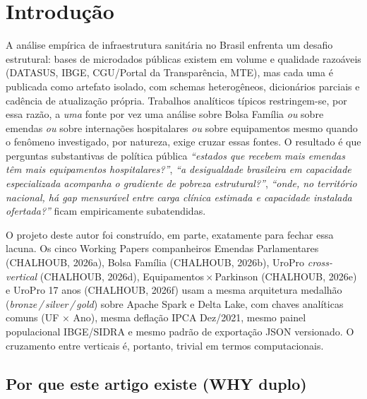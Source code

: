 \documentclass[12pt,a4paper,oneside]{article}
\begin{document}
\newpage
\renewcommand{\contentsname}{Sumário}
\tableofcontents
\vspace{0.5cm}
\renewcommand{\listfigurename}{Lista de Figuras}
\listoffigures
\newpage

\section{Introdução}\label{sec:intro}

A análise empírica de infraestrutura sanitária no Brasil enfrenta um
desafio estrutural: bases de microdados públicas existem em volume e
qualidade razoáveis (DATASUS, IBGE, CGU/Portal da Transparência,
MTE), mas cada uma é publicada como artefato isolado, com schemas
heterogêneos, dicionários parciais e cadência de atualização própria.
Trabalhos analíticos típicos restringem-se, por essa razão, a
\textit{uma} fonte por vez \textemdash{} uma análise sobre Bolsa
Família \textit{ou} sobre emendas \textit{ou} sobre internações
hospitalares \textit{ou} sobre equipamentos \textemdash{} mesmo
quando o fenômeno investigado, por natureza, exige cruzar essas
fontes. O resultado é que perguntas substantivas de política pública
\textemdash{} \textit{``estados que recebem mais emendas têm mais
equipamentos hospitalares?''}, \textit{``a desigualdade brasileira
em capacidade especializada acompanha o gradiente de pobreza
estrutural?''}, \textit{``onde, no território nacional, há gap
mensurável entre carga clínica estimada e capacidade instalada
ofertada?''} \textemdash{} ficam empiricamente subatendidas.

O projeto deste autor foi construído, em parte, exatamente para
fechar essa lacuna. Os cinco Working Papers companheiros
\textemdash{} Emendas Parlamentares (CHALHOUB, 2026a), Bolsa
Família (CHALHOUB, 2026b), UroPro \textit{cross-vertical}
(CHALHOUB, 2026d), Equipamentos\,$\times$\,Parkinson (CHALHOUB,
2026e) e UroPro 17 anos (CHALHOUB, 2026f) \textemdash{} usam a
mesma arquitetura medalhão (\textit{bronze\,/\,silver\,/\,gold})
sobre Apache Spark e Delta Lake, com chaves analíticas comuns
(UF $\times$ Ano), mesma deflação IPCA Dez/2021, mesmo painel
populacional IBGE/SIDRA e mesmo padrão de exportação JSON
versionado. O cruzamento entre verticais é, portanto, trivial em
termos computacionais.

\subsection{Por que este artigo existe (WHY duplo)}
\end{document}
